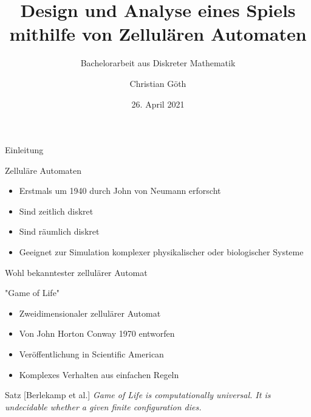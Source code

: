 \documentclass[aspectratio=169]{beamer}
\title[Zelluläre Automaten]{Design und Analyse eines Spiels \newline mithilfe von Zellulären Automaten}
\subtitle{Bachelorarbeit aus Diskreter Mathematik}
\author[C. Göth]{Christian Göth}
\institute[TU Wien]{TU Wien, Vienna, Austria}
\date{26. April 2021}
\begin{document}
\begin{frame}
    \titlepage
\end{frame}



  \begin{frame}{Einleitung}

    \begin{block}{Zelluläre Automaten}
      \begin{itemize}
        \item Erstmals um 1940 durch John von Neumann erforscht \\ %
        \item Sind zeitlich diskret \\
        \item Sind räumlich diskret \\
        \item Geeignet zur Simulation komplexer physikalischer oder biologischer Systeme
      \end{itemize}
    \end{block}

  \end{frame}



  \begin{frame}{Wohl bekanntester zellulärer Automat}
    \begin{block}{"Game of Life"}
      \begin{itemize}
        \item Zweidimensionaler zellulärer Automat
        \item Von John Horton Conway 1970 entworfen %
        \item Veröffentlichung in Scientific American %
        \item Komplexes Verhalten aus einfachen Regeln
      \end{itemize}
    \end{block}

    \pause

    \begin{block}{Satz [Berlekamp et al.]}
      \textit{Game of Life is computationally universal. It is undecidable whether a given finite configuration dies.}
    \end{block}

  \end{frame}
\end{document}
